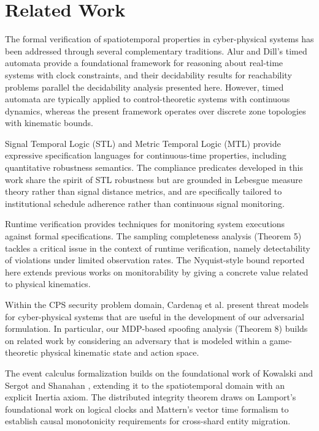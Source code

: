 \documentclass[conference]{IEEEtran}
\begin{document}
\section{Related Work}

The formal verification of spatiotemporal properties in cyber-physical systems has been addressed through several complementary traditions. Alur and Dill's timed automata \cite{b26} provide a foundational framework for reasoning about real-time systems with clock constraints, and their decidability results for reachability problems parallel the decidability analysis presented here. However, timed automata are typically applied to control-theoretic systems with continuous dynamics, whereas the present framework operates over discrete zone topologies with kinematic bounds.

Signal Temporal Logic (STL) and Metric Temporal Logic (MTL) \cite{b27} provide expressive specification languages for continuous-time properties, including quantitative robustness semantics. The compliance predicates developed in this work share the spirit of STL robustness but are grounded in Lebesgue measure theory rather than signal distance metrics, and are specifically tailored to institutional schedule adherence rather than continuous signal monitoring.

Runtime verification \cite{b28} provides techniques for monitoring system executions against formal specifications. The sampling completeness analysis (Theorem 5) tackles a critical issue in the context of runtime verification, namely detectability of violations under limited observation rates. The Nyquist-style bound reported here extends previous works on monitorability \cite{b27} by giving a concrete value related to physical kinematics.

Within the CPS security problem domain, Cardenaş et al. \cite{b18} present threat models for cyber-physical systems that are useful in the development of our adversarial formulation. In particular, our MDP-based spoofing analysis (Theorem 8) builds on related work by considering an adversary that is modeled within a game-theoretic physical kinematic state and action space.

The event calculus formalization builds on the foundational work of Kowalski and Sergot \cite{b2} and Shanahan \cite{b19}, extending it to the spatiotemporal domain with an explicit Inertia axiom. The distributed integrity theorem draws on Lamport's foundational work on logical clocks \cite{b8} and Mattern's vector time formalism \cite{b25} to establish causal monotonicity requirements for cross-shard entity migration.
\end{document}
